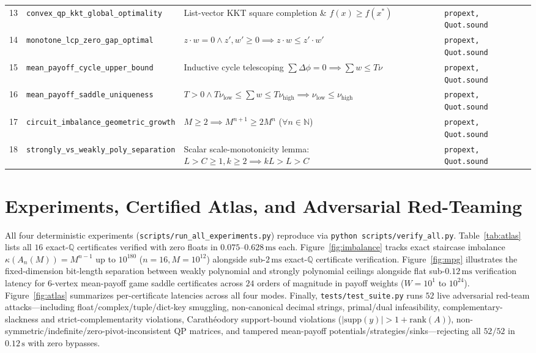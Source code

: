 \documentclass[11pt,a4paper]{article}
\theoremstyle{definition}
\theoremstyle{remark}
\newcommand{\QQ}{\mathbb{Q}}
\begin{document}
\begin{table}[t]
{\begin{tabular}{@{}clll@{}}
13 & \texttt{convex\_qp\_kkt\_global\_optimality} & List-vector KKT square completion \& $f(x) \ge f(x^*)$ & \texttt{propext, Quot.sound} \\
14 & \texttt{monotone\_lcp\_zero\_gap\_optimal} & $z\cdot w = 0 \wedge z',w' \ge 0 \implies z\cdot w \le z'\cdot w'$ & \texttt{propext, Quot.sound} \\
15 & \texttt{mean\_payoff\_cycle\_upper\_bound} & Inductive cycle telescoping $\sum\Delta\phi = 0 \implies \sum w \le T\nu$ & \texttt{propext, Quot.sound} \\
16 & \texttt{mean\_payoff\_saddle\_uniqueness} & $T > 0 \wedge T\nu_{\mathrm{low}} \le \sum w \le T\nu_{\mathrm{high}} \implies \nu_{\mathrm{low}} \le \nu_{\mathrm{high}}$ & \texttt{propext, Quot.sound} \\
17 & \texttt{circuit\_imbalance\_geometric\_growth} & $M \ge 2 \implies M^{n+1} \ge 2 M^n$ ($\forall n \in \mathbb{N}$) & \texttt{propext, Quot.sound} \\
18 & \texttt{strongly\_vs\_weakly\_poly\_separation} & Scalar scale-monotonicity lemma: $L > C \ge 1, k \ge 2 \implies kL > L > C$ & \texttt{propext, Quot.sound} \\
\bottomrule
\end{tabular}}
\end{table}

\section{Experiments, Certified Atlas, and Adversarial Red-Teaming}\label{sec:experiments}

All four deterministic experiments (\texttt{scripts/run\_all\_experiments.py}) reproduce via \texttt{python scripts/verify\_all.py}. Table~\ref{tab:atlas} lists all $16$ exact-$\QQ$ certificates verified with zero floats in $0.075$--$0.628\,\mathrm{ms}$ each. Figure~\ref{fig:imbalance} tracks exact staircase imbalance $\kappa(A_n(M)) = M^{n-1}$ up to $10^{180}$ ($n=16, M=10^{12}$) alongside sub-$2\,\mathrm{ms}$ exact-$\QQ$ certificate verification. Figure~\ref{fig:mpg} illustrates the fixed-dimension bit-length separation between weakly polynomial and strongly polynomial ceilings alongside flat sub-$0.12\,\mathrm{ms}$ verification latency for $6$-vertex mean-payoff game saddle certificates across $24$ orders of magnitude in payoff weights ($W = 10^1$ to $10^{24}$). Figure~\ref{fig:atlas} summarizes per-certificate latencies across all four modes. Finally, \texttt{tests/test\_suite.py} runs $52$ live adversarial red-team attacks---including float/complex/tuple/dict-key smuggling, non-canonical decimal strings, primal/dual infeasibility, complementary-slackness and strict-complementarity violations, Carath\'eodory support-bound violations ($|\mathrm{supp}(y)| > 1 + \mathrm{rank}(A)$), non-symmetric/indefinite/zero-pivot-inconsistent QP matrices, and tampered mean-payoff potentials/strategies/sinks---rejecting all $52/52$ in $0.12\,\mathrm{s}$ with zero bypasses.
\end{document}
